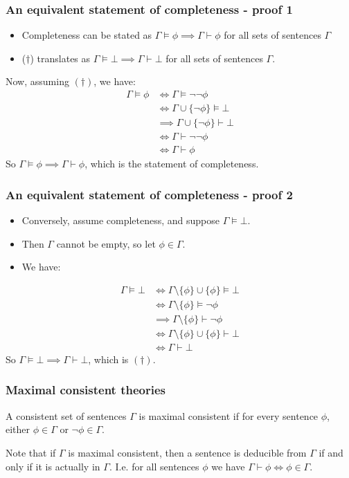 \documentclass[handout]{beamer}
\begin{document}
\begin{frame}
\frametitle{An equivalent statement of completeness - proof 1}
\begin{itemize}
\item Completeness can be stated as $\Gamma\models \phi\implies \Gamma\vdash \phi$ for all sets of sentences $\Gamma$
\item ($\dagger$) translates as $\Gamma\models \bot \implies \Gamma\vdash \bot$ for all sets of sentences $\Gamma$.
\end{itemize}

Now, assuming $(\dagger)$, we have:
\begin{align*}
\Gamma\models \phi &\iff \Gamma\models \neg\neg\phi\\
&\iff\Gamma \cup\{\neg\phi\}\models \bot \\
&\implies \Gamma \cup\{\neg\phi\}\vdash \bot \\
&\iff \Gamma\vdash \neg\neg\phi \\
&\iff \Gamma\vdash \phi
\end{align*}
So $\Gamma\models \phi \implies \Gamma\vdash \phi$, which is the statement of completeness.
\end{frame}



\begin{frame}
\frametitle{An equivalent statement of completeness - proof 2}
\begin{itemize}
\item Conversely, assume completeness, and suppose $\Gamma\models \bot$. 
\item Then $\Gamma$ cannot be empty, so let $\phi\in \Gamma$. 
\item We have: 
\end{itemize}
\begin{align*}
\Gamma \models \bot &\iff \Gamma\setminus\{\phi\}\cup\{\phi\}\models \bot \\
&\iff  \Gamma\setminus\{\phi\}\models \neg\phi \\
&\implies \Gamma\setminus\{\phi\}\vdash \neg\phi \\
&\iff \Gamma\setminus\{\phi\}\cup\{\phi\}\vdash \bot \\
&\iff \Gamma\vdash\bot
\end{align*}
So $\Gamma\models \bot \implies \Gamma\vdash \bot$, which is $(\dagger)$.
\end{frame}

\begin{frame}
\frametitle{Maximal consistent theories}
\begin{definition}
A consistent set of sentences $\Gamma$ is maximal consistent if for every sentence $\phi$, either $\phi\in\Gamma$ or $\neg\phi\in \Gamma$.
\end{definition}
\vspace{1cm}
Note that if $\Gamma$ is maximal consistent, then a sentence is deducible from $\Gamma$ if and only if it is actually in $\Gamma$. I.e. for all sentences $\phi$ we have $\Gamma\vdash \phi \iff \phi\in \Gamma$.
\end{frame}
\end{document}
